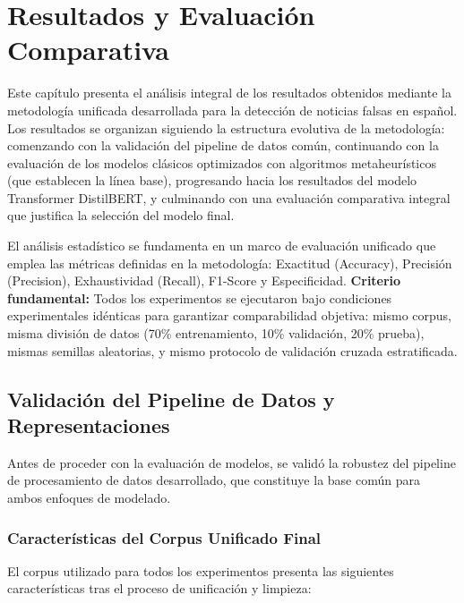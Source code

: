 \chapter{Resultados y Evaluación Comparativa \label{cap:AnalisisDeResultados}}

Este capítulo presenta el análisis integral de los resultados obtenidos mediante la metodología unificada desarrollada para la detección de noticias falsas en español. Los resultados se organizan siguiendo la estructura evolutiva de la metodología: comenzando con la validación del pipeline de datos común, continuando con la evaluación de los modelos clásicos optimizados con algoritmos metaheurísticos (que establecen la línea base), progresando hacia los resultados del modelo Transformer DistilBERT, y culminando con una evaluación comparativa integral que justifica la selección del modelo final.

El análisis estadístico se fundamenta en un marco de evaluación unificado que emplea las métricas definidas en la metodología: Exactitud (Accuracy), Precisión (Precision), Exhaustividad (Recall), F1-Score y Especificidad. \textbf{Criterio fundamental:} Todos los experimentos se ejecutaron bajo condiciones experimentales idénticas para garantizar comparabilidad objetiva: mismo corpus, misma división de datos (70\% entrenamiento, 10\% validación, 20\% prueba), mismas semillas aleatorias, y mismo protocolo de validación cruzada estratificada.

\section{Validación del Pipeline de Datos y Representaciones}
\label{sec:validacion_pipeline_datos}

Antes de proceder con la evaluación de modelos, se validó la robustez del pipeline de procesamiento de datos desarrollado, que constituye la base común para ambos enfoques de modelado.

\subsection{Características del Corpus Unificado Final}

El corpus utilizado para todos los experimentos presenta las siguientes características tras el proceso de unificación y limpieza: 


